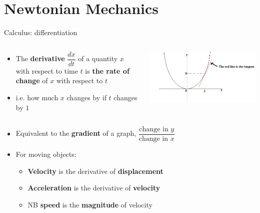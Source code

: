 \part{Newtonian Mechanics}
\frame{\partpage}

\begin{frame}{Calculus: differentiation}
	\begin{columns}
		\begin{column}{0.58\textwidth}
			\begin{itemize}
				\pause\item The \textbf{derivative} $\dfrac{dx}{dt}$ of a quantity $x$ with respect to time $t$ is \textbf{the rate of change} of $x$ with respect to $t$
				\pause\item i.e. how much $x$ changes by if $t$ changes by $1$
			\end{itemize}
		\end{column}
		\begin{column}{0.4\textwidth}
			\includegraphics[width=\textwidth]{gradient}
		\end{column}
	\end{columns}
	\begin{itemize}
		\pause\item Equivalent to the \textbf{gradient} of a graph, $\dfrac{\text{change in } y}{\text{change in } x}$		
		\pause\item For moving objects:
		\begin{itemize}
			\pause\item \textbf{Velocity} is the derivative of \textbf{displacement}
			\pause\item \textbf{Acceleration} is the derivative of \textbf{velocity}
			\pause\item NB \textbf{speed} is the \textbf{magnitude} of velocity
		\end{itemize}
	\end{itemize}
\end{frame}

